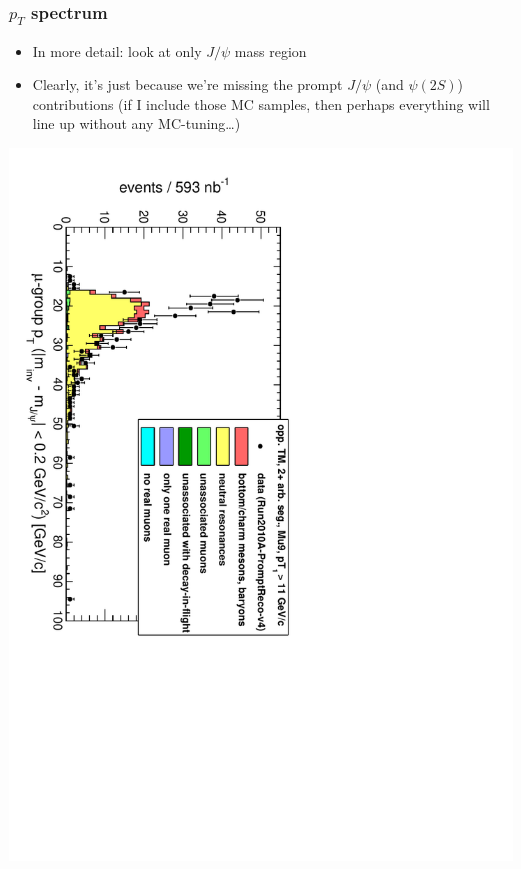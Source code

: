 \documentclass[compress]{beamer}
\begin{document}
\begin{frame}
\frametitle{$p_T$ spectrum}
\begin{itemize}
\item In more detail: look at only $J/\psi$ mass region
\item Clearly, it's just because we're missing the prompt $J/\psi$
(and $\psi(2S)$) contributions {\scriptsize (if I include those MC
samples, then perhaps everything will line up without any
MC-tuning\ldots)}
\end{itemize}

\vfill
\includegraphics[height=\linewidth, angle=90]{Mu9_pt_jpsi.pdf}
\end{frame}
\end{document}
